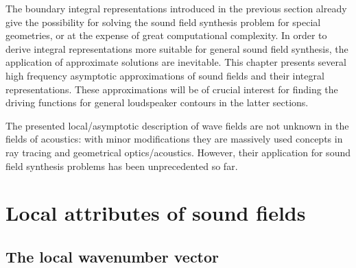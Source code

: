 The boundary integral representations introduced in the previous section already give the possibility for solving the sound field synthesis problem for special geometries, or at the expense of great computational complexity.
In order to derive integral representations more suitable for general sound field synthesis, the application of approximate solutions are inevitable.
This chapter presents several high frequency asymptotic approximations of sound fields and their integral representations.
These approximations will be of crucial interest for finding the driving functions for general loudspeaker contours in the latter sections.


The presented local/asymptotic description of wave fields are not unknown in the fields of acoustics: with minor modifications they are massively used concepts in ray tracing and geometrical optics/acoustics.
However, their application for sound field synthesis problems has been unprecedented so far.

\section{Local attributes of sound fields}
\subsection{The local wavenumber vector}

